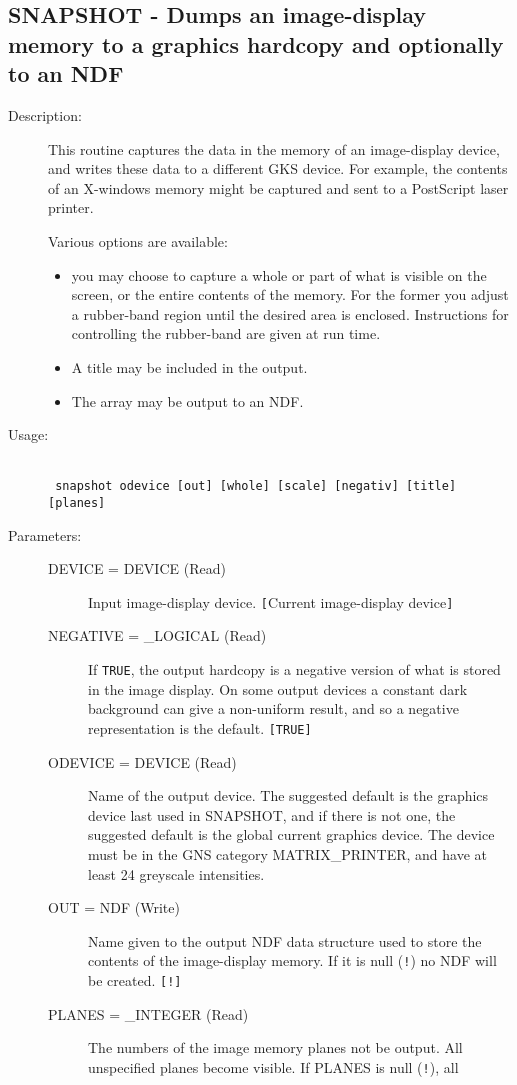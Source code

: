 \documentclass[twoside,11pt]{article}
\newcommand{\stardocinitials}  {SUN}
\newcommand{\stardocnumber}    {239.2}
\newcommand{\stardocname}{\stardocinitials /\stardocnumber}
\newcommand{\htmlref}[2]{#1}
\newcommand{\xlabel}[1]{}
\newlength{\sstbannerlength}
\newlength{\sstcaptionlength}
\newlength{\sstexampleslength}
\newlength{\sstexampleswidth}
\newcommand{\sstroutine}[3]{
   \goodbreak
   \markboth{{\stardocname}~ --- #1}{{\stardocname}~ --- #1}
   \rule{\textwidth}{0.5mm}
   \vspace{-7ex}
   \newline
   \settowidth{\sstbannerlength}{{\Large {\bf #1}}}
   \setlength{\sstcaptionlength}{\textwidth}
   \setlength{\sstexampleslength}{\textwidth}
   \addtolength{\sstbannerlength}{0.5em}
   \addtolength{\sstcaptionlength}{-2.0\sstbannerlength}
   \addtolength{\sstcaptionlength}{-4.9pt}
   \settowidth{\sstexampleswidth}{{\bf Examples:}}
   \addtolength{\sstexampleslength}{-\sstexampleswidth}
   \parbox[t]{\sstbannerlength}{\flushleft{\Large {\bf #1}}}
   \parbox[t]{\sstcaptionlength}{\center{\Large #2}}
   \parbox[t]{\sstbannerlength}{\flushright{\Large {\bf #1}}}
   \begin{description}
      #3
   \end{description}
}
\newcommand{\sstdescription}[1]{\item[Description:] #1}
\newcommand{\sstusage}[1]{\pagebreak[3] \item[Usage:] \mbox{} \\[1.3ex] {\ssttt #1}}
\newcommand{\sstparameters}[1]{
   \goodbreak 
   \item[Parameters:] \mbox{} \\
   \vspace{-3.5ex}
   \begin{description}
      #1
   \end{description}
}
\newcommand{\sstsubsection}[1]{ \item[{#1}] \mbox{} \\}
\newcommand{\ssttt}{\tt}
\renewcommand{\sstroutine}[3]{
      \subsection{#1\xlabel{#1}-\label{#1}#2}
      \begin{description}
         #3
      \end{description}
   }
\renewcommand{\sstdescription}[1]{\item[Description:]
      \begin{description}
         #1
      \end{description}
   }
\renewcommand{\sstusage}[1]{\htmlref{\item[Usage:]}{ap:usage} \mbox{} \\ {\ssttt #1}}
\renewcommand{\sstparameters}[1]{
      \htmlref{\item[Parameters:]}{se:param}
      \begin{description}
         #1
      \end{description}
   }
\renewcommand{\sstsubsection}[1]{\item[{#1}]}
\begin{document}
\sstroutine{
   SNAPSHOT
}{
   Dumps an image-display memory to a graphics hardcopy and
   optionally to an NDF
}{
   \sstdescription{
      This routine captures the data in the memory of an image-display
      device, and writes these data to a different GKS device.  For
      example, the contents of an X-windows memory might be captured and
      sent to a PostScript laser printer.

      Various options are available:
      \begin{itemize}
         \item you may choose to capture a whole or part of what is visible
           on the screen, or the entire contents of the memory.  For the
           former you adjust a rubber-band region until the desired
           area is enclosed. Instructions for controlling the
           rubber-band are given at run time.
         \item A title may be included in the output.
         \item The array may be output to an NDF.
      \end{itemize}
   }
   \sstusage{
      snapshot odevice [out] [whole] [scale] [negativ] [title] [planes]
   }
   \sstparameters{
      \sstsubsection{
         DEVICE = DEVICE (Read)
      }{
         Input image-display device.  {\tt [}Current image-display 
         device{\tt ]}
      }
      \sstsubsection{
         NEGATIVE = \_LOGICAL (Read)
      }{
         If {\tt TRUE}, the output hardcopy is a negative version of what is
         stored in the image display.  On some output devices a
         constant dark background can give a non-uniform result, and
         so a negative representation is the default. {\tt [TRUE]}
      }
      \sstsubsection{
         ODEVICE = DEVICE (Read)
      }{
         Name of the output device.  The suggested default is the
         graphics device last used in SNAPSHOT, and if there is not one,
         the suggested default is the global current graphics device.
         The device must be in the GNS category MATRIX\_PRINTER, and
         have at least 24 greyscale intensities.
      }
      \sstsubsection{
         OUT = NDF (Write)
      }{
         Name given to the output NDF data structure used to store the
         contents of the image-display memory.  If it is null ({\tt !}) no
         NDF will be created. {\tt [!]}
      }
      \sstsubsection{
         PLANES = \_INTEGER (Read)
      }{
         The numbers of the image memory planes not be output.  All
         unspecified planes become visible.  If PLANES is null ({\tt !}), all
}}}
\end{document}
